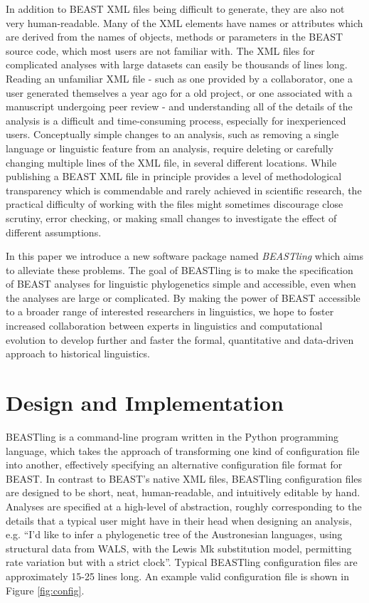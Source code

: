 \documentclass[twocolumn,10pt]{scrartcl}
\begin{document}
In addition to BEAST XML files being difficult to generate, they are also not very human-readable.  Many of the XML elements have names or attributes which are derived from the names of objects, methods or parameters in the BEAST source code, which most users are not familiar with.  The XML files for complicated analyses with large datasets can easily be thousands of lines long.  Reading an unfamiliar XML file - such as one provided by a collaborator, one a user generated themselves a year ago for a old project, or one associated with a manuscript undergoing peer review - and understanding all of the details of the analysis is a difficult and time-consuming process, especially for inexperienced users.  Conceptually simple changes to an analysis, such as removing a single language or linguistic feature from an analysis, require deleting or carefully changing multiple lines of the XML file, in several different locations.  While publishing a BEAST XML file in principle provides a level of methodological transparency which is commendable and rarely achieved in scientific research, the practical difficulty of working with the files might sometimes discourage close scrutiny, error checking, or making small changes to investigate the effect of different assumptions.

In this paper we introduce a new software package named \emph{BEASTling} which aims to alleviate these problems.  The goal of BEASTling is to make the specification of BEAST analyses for linguistic phylogenetics simple and accessible, even when the analyses are large or complicated.  By making the power of BEAST accessible to a broader range of interested researchers in linguistics, we hope to foster increased collaboration between experts in linguistics and computational evolution to develop further and faster the formal, quantitative and data-driven approach to historical linguistics.

\section{Design and Implementation}

BEASTling is a command-line program written in the Python programming language, which takes the approach of transforming one kind of configuration file into another, effectively specifying an alternative configuration file format for BEAST.  In contrast to BEAST's native XML files, BEASTling configuration files are designed to be short, neat, human-readable, and intuitively editable by hand.  Analyses are specified at a high-level of abstraction, roughly corresponding to the details that a typical user might have in their head when designing an analysis, e.g. ``I'd like to infer a phylogenetic tree of the Austronesian languages, using structural data from WALS,  with the Lewis Mk substitution model, permitting rate variation but with a strict clock''.  Typical BEASTling configuration files are approximately 15-25 lines long.  An example valid configuration file is shown in Figure \ref{fig:config}.
\end{document}
